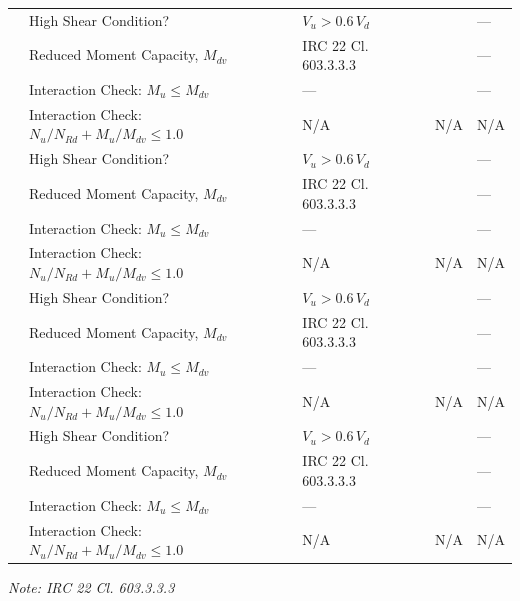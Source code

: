 \documentclass[12pt,a4paper]{report}
\numberwithin{table}{chapter}
\numberwithin{figure}{chapter}
\begin{document}
\begin{longtable}{|C{2.5cm}|C{3.5cm}|C{3.5cm}|>{\centering\arraybackslash}p{4.2cm}|C{1.8cm}|}
\hline
\endlastfoot
{} & High Shear Condition? & $V_u > 0.6\,V_d$ &  & --- \\[6pt]
 & Reduced Moment Capacity, $M_{dv}$ & IRC 22 Cl. 603.3.3.3 &  & --- \\[6pt]
 & Interaction Check: $M_u \leq M_{dv}$ & --- &  & --- \\[6pt]
 & Interaction Check: $N_u/N_{Rd} + M_u/M_{dv} \leq 1.0$ & N/A & N/A & N/A \\[6pt]
\hline
{} & High Shear Condition? & $V_u > 0.6\,V_d$ &  & --- \\[6pt]
 & Reduced Moment Capacity, $M_{dv}$ & IRC 22 Cl. 603.3.3.3 &  & --- \\[6pt]
 & Interaction Check: $M_u \leq M_{dv}$ & --- &  & --- \\[6pt]
 & Interaction Check: $N_u/N_{Rd} + M_u/M_{dv} \leq 1.0$ & N/A & N/A & N/A \\[6pt]
\hline
{} & High Shear Condition? & $V_u > 0.6\,V_d$ &  & --- \\[6pt]
 & Reduced Moment Capacity, $M_{dv}$ & IRC 22 Cl. 603.3.3.3 &  & --- \\[6pt]
 & Interaction Check: $M_u \leq M_{dv}$ & --- &  & --- \\[6pt]
 & Interaction Check: $N_u/N_{Rd} + M_u/M_{dv} \leq 1.0$ & N/A & N/A & N/A \\[6pt]
\hline
{} & High Shear Condition? & $V_u > 0.6\,V_d$ &  & --- \\[6pt]
 & Reduced Moment Capacity, $M_{dv}$ & IRC 22 Cl. 603.3.3.3 &  & --- \\[6pt]
 & Interaction Check: $M_u \leq M_{dv}$ & --- &  & --- \\[6pt]
 & Interaction Check: $N_u/N_{Rd} + M_u/M_{dv} \leq 1.0$ & N/A & N/A & N/A \\[6pt]
\hline
\end{longtable}
\noindent\textit{Note: IRC 22 Cl. 603.3.3.3}
\end{document}
